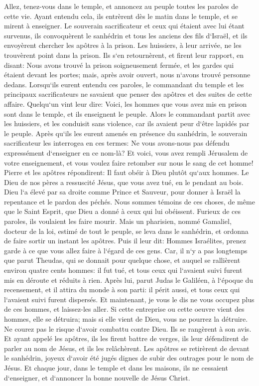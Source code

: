 \verse Allez, tenez-vous dans le temple, et annoncez au peuple toutes les paroles de cette vie. 
\verse Ayant entendu cela, ils entrèrent dès le matin dans le temple, et se mirent à enseigner. Le souverain sacrificateur et ceux qui étaient avec lui étant survenus, ils convoquèrent le sanhédrin et tous les anciens des fils d`Israël, et ils envoyèrent chercher les apôtres à la prison. 
\verse Les huissiers, à leur arrivée, ne les trouvèrent point dans la prison. Ils s`en retournèrent, et firent leur rapport, 
\verse en disant: Nous avons trouvé la prison soigneusement fermée, et les gardes qui étaient devant les portes; mais, après avoir ouvert, nous n`avons trouvé personne dedans. 
\verse Lorsqu`ils eurent entendu ces paroles, le commandant du temple et les principaux sacrificateurs ne savaient que penser des apôtres et des suites de cette affaire. 
\verse Quelqu`un vint leur dire: Voici, les hommes que vous avez mis en prison sont dans le temple, et ils enseignent le peuple. 
\verse Alors le commandant partit avec les huissiers, et les conduisit sans violence, car ils avaient peur d`être lapidés par le peuple. 
\verse Après qu`ils les eurent amenés en présence du sanhédrin, le souverain sacrificateur les interrogea en ces termes: 
\verse Ne vous avons-nous pas défendu expressément d`enseigner en ce nom-là? Et voici, vous avez rempli Jérusalem de votre enseignement, et vous voulez faire retomber sur nous le sang de cet homme! 
\verse Pierre et les apôtres répondirent: Il faut obéir à Dieu plutôt qu`aux hommes. 
\verse Le Dieu de nos pères a ressuscité Jésus, que vous avez tué, en le pendant au bois. 
\verse Dieu l`a élevé par sa droite comme Prince et Sauveur, pour donner à Israël la repentance et le pardon des péchés. 
\verse Nous sommes témoins de ces choses, de même que le Saint Esprit, que Dieu a donné à ceux qui lui obéissent. 
\verse Furieux de ces paroles, ils voulaient les faire mourir. 
\verse Mais un pharisien, nommé Gamaliel, docteur de la loi, estimé de tout le peuple, se leva dans le sanhédrin, et ordonna de faire sortir un instant les apôtres. 
\verse Puis il leur dit: Hommes Israélites, prenez garde à ce que vous allez faire à l`égard de ces gens. 
\verse Car, il n`y a pas longtemps que parut Theudas, qui se donnait pour quelque chose, et auquel se rallièrent environ quatre cents hommes: il fut tué, et tous ceux qui l`avaient suivi furent mis en déroute et réduits à rien. 
\verse Après lui, parut Judas le Galiléen, à l`époque du recensement, et il attira du monde à son parti: il périt aussi, et tous ceux qui l`avaient suivi furent dispersés. 
\verse Et maintenant, je vous le dis ne vous occupez plus de ces hommes, et laissez-les aller. Si cette entreprise ou cette oeuvre vient des hommes, elle se détruira; 
\verse mais si elle vient de Dieu, vous ne pourrez la détruire. Ne courez pas le risque d`avoir combattu contre Dieu. 
\verse Ils se rangèrent à son avis. Et ayant appelé les apôtres, ils les firent battre de verges, ils leur défendirent de parler au nom de Jésus, et ils les relâchèrent. 
\verse Les apôtres se retirèrent de devant le sanhédrin, joyeux d`avoir été jugés dignes de subir des outrages pour le nom de Jésus. 
\verse Et chaque jour, dans le temple et dans les maisons, ils ne cessaient d`enseigner, et d`annoncer la bonne nouvelle de Jésus Christ. 

